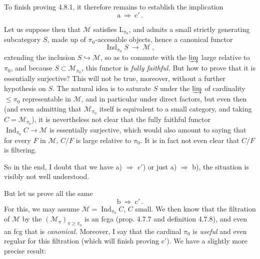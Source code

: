 \documentclass[11pt]{article}
\newcommand{\printedpage}[1]{\marginpar{\footnotesize p.~#1}}
\newcommand{\msp}[1]{\marginpar{\footnotesize [#1]}}
\newcommand{\Ind}{\operatorname{Ind}}
\begin{document}
To finish proving 4.8.1, it therefore remains to establish the implication
\[
\mathrm{a} \ \Longrightarrow \ \mathrm{c}' \, .
\]

\printedpage{70}

Let us suppose then that $\mathcal{M}$ satisfies $\mathrm{L}_{\pi_0}$, and admits a small strictly generating subcategory $S$, made up of $\pi_0$-accessible objects, hence a canonical functor
\[
\Ind_{\pi_0}S \ \longrightarrow \ \mathcal{M} \ ,
\]
extending the inclusion $S\hookrightarrow\mathcal{M}$, so as to commute with the $\varinjlim$ large relative to $\pi_0$, and because $S\subset\mathcal{M}_{\pi_0}$, this functor is \textit{fully faithful.} But how to prove that it is essentially surjective? This will not be true, moreover, without a further hypothesis on $S$. The natural idea is to saturate $S$ under the $\varinjlim$
\msp{page 200}
of cardinality $\leqslant\pi_0$ representable in $\mathcal{M}$, and in particular under direct factors, but even then (and even admitting that $\mathcal{M}_{\pi_0}$ itself is equivalent to a small category, and taking $C=\mathcal{M}_{\pi_0}$), it is nevertheless not clear that the fully faithful functor $\Ind_{\pi_0}C\longrightarrow\mathcal{M}$ is essentially surjective, which would also amount to saying that for every $F$ in $\mathcal{M}$, $C/F$ is large relative to $\pi_0$. It is in fact not even clear that $C/F$ is filtering.

So in the end, I doubt that we have a) $\Longrightarrow$ c$'$) or just a) $\Longrightarrow$ b), the situation is visibly not well understood.

But let us prove all the same
\[
\mathrm{b} \ \Longrightarrow \ \mathrm{c}' \, .
\]
For this, we may assume $\mathcal{M}=\Ind_{\pi_0}C$, $C$ small. We then know that the filtration of $\mathcal{M}$ by the $(\mathcal{M}_\pi)_{\pi\geqslant\pi_0}$ is an fcga (prop. 4.7.7 and definition 4.7.8), and even an fcg that is \textit{canonical.} Moreover, I say that the cardinal $\pi_0$ is \textit{useful} and even regular for this filtration (which will finish proving c$'$). We have a slightly more precise result:
\end{document}
